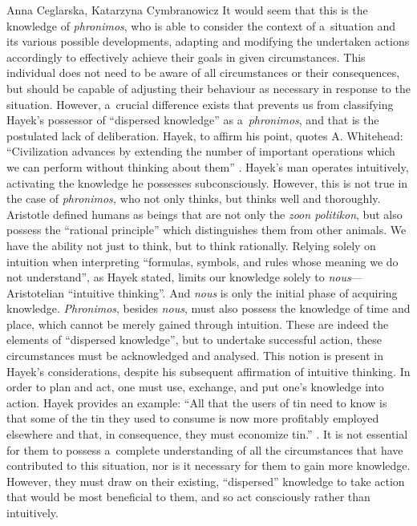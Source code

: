 \begin{artengenv2auth}{Anna Ceglarska, Katarzyna Cymbranowicz}
It would seem that this is the knowledge of \textit{phronimos}, who is able to consider the context of a~situation and its various possible developments, adapting and modifying the undertaken actions accordingly to effectively achieve their goals in given circumstances. This individual does not need to be aware of all circumstances or their consequences, but should be capable of adjusting their behaviour as necessary in response to the situation. However, a~crucial difference exists that prevents us from classifying Hayek's possessor of ``dispersed knowledge'' as a~\textit{phronimos}, and that is the postulated lack of deliberation. Hayek, to affirm his point, quotes A. Whitehead: ``Civilization advances by extending the number of important operations which we can perform without thinking about them'' 
\parencite[][p.528]{hayek_use_1945}. %
 Hayek's man operates intuitively, activating the knowledge he possesses subconsciously. However, this is not true in the case of \textit{phronimos,} who not only thinks, but thinks well and thoroughly. Aristotle defined humans as beings that are not only the \textit{zoon politikon}, but also possess the ``rational principle'' 
\parencite[][]{rackham_nicomachean_1934} %
 which distinguishes them from other animals. We have the ability not just to think, but to think rationally. Relying solely on intuition when interpreting ``formulas, symbols, and rules whose meaning we do not understand'', as Hayek 
\parencite*[][p.528]{hayek_use_1945} %
 stated, limits our knowledge solely to \textit{nous}---Aristotelian ``intuitive thinking''. And \textit{nous} is only the initial phase of acquiring knowledge. \textit{Phronimos}, besides \textit{nous}, must also possess the knowledge of time and place, which cannot be merely gained through intuition. These are indeed the elements of ``dispersed knowledge'', but to undertake successful action, these circumstances must be acknowledged and analysed. This notion is present in Hayek's considerations, despite his subsequent affirmation of intuitive thinking. In order to plan and act, one must use, exchange, and put one's knowledge into action. Hayek provides an example: ``All that the users of tin need to know is that some of the tin they used to consume is now more profitably employed elsewhere and that, in consequence, they must economize tin.'' 
\parencite[][p.526]{hayek_use_1945}. %
 It is not essential for them to possess a~complete understanding of all the circumstances that have contributed to this situation, nor is it necessary for them to gain more knowledge. However, they must draw on their existing, ``dispersed'' knowledge to take action that would be most beneficial to them, and so act consciously rather than intuitively.




\end{artengenv2auth}
